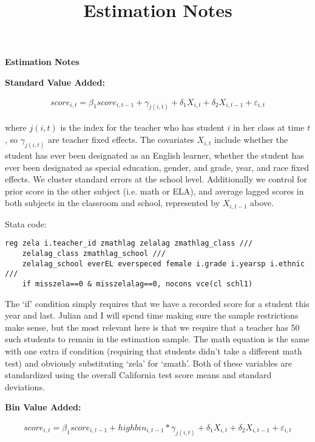 \documentclass[letterpaper,12pt]{article}
\title{Estimation Notes}
\date{}
\begin{document}
\begin{center}
    \noindent \textbf{\Large Estimation Notes}
\end{center}

\noindent \textbf{Standard Value Added:}

    \begin{align*}
        score_{i,t} = \beta_1 score_{i,t-1} + \gamma_{j(i, t)} + \delta_1 X_{i, t} + \delta_2 X_{i, t-1} + \varepsilon_{i, t}
    \end{align*}
    
\noindent where $j(i, t)$ is the index for the teacher who has student $i$ in her class at time $t$, so $\gamma_{j(i, t)}$ are teacher fixed effects. The covariates $X_{i, t}$ include whether the student has ever been designated as an English learner, whether the student has ever been designated as special education, gender, and grade, year, and race fixed effects. We cluster standard errors at the school level. Additionally we control for prior score in the other subject (i.e. math or ELA), and average lagged scores in both subjects in the classroom and school, represented by $X_{i, t-1}$ above.

\vspace{.5cm}

\noindent Stata code:

\begin{verbatim}
reg zela i.teacher_id zmathlag zelalag zmathlag_class ///
    zelalag_class zmathlag_school ///
    zelalag_school everEL everspeced female i.grade i.yearsp i.ethnic ///
    if misszela==0 & misszelalag==0, nocons vce(cl schl1)
\end{verbatim}

\noindent The `if' condition simply requires that we have a recorded score for a student this year and last. Julian and I will spend time making sure the sample restrictions make sense, but the most relevant here is that we require that a teacher has 50 such students to remain in the estimation sample. The math equation is the same with one extra if condition (requiring that students didn't take a different math test) and obviously substituting `zela' for `zmath'. Both of these variables are standardized using the overall California test score means and standard deviations.

\vspace{1cm}



\noindent \textbf{Bin Value Added:}


    \begin{align*}
        score_{i,t} = \beta_1 score_{i,t-1} + highbin_{i,t-1}*\gamma_{j(i, t)} + \delta_1 X_{i, t} + \delta_2 X_{i, t-1} + \varepsilon_{i, t}
    \end{align*}
    
\end{document}
